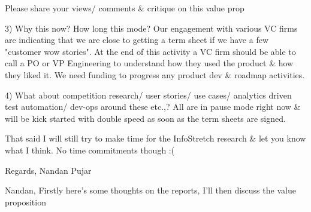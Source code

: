 Please share your views/ comments & critique on this value prop

3) Why this now? How long this mode? 
Our engagement with various VC firms are indicating that we are close to getting a term sheet if we have a few "customer wow stories". At the end of this activity a VC firm should be able to call a PO or VP Engineering to understand how they used the product & how they liked it. We need funding to progress any product dev & roadmap activities.

4) What about competition research/ user stories/ use cases/ analytics driven test automation/ dev-ops around these etc.,?
All are in pause mode right now & will be kick started with double speed as soon as the term sheets are signed.

That said I will still try to make time for the InfoStretch research & let you know what I think. No time commitments though :(

Regards,
Nandan Pujar


Nandan,
Firstly here's some thoughts on the reports, I'll then discuss the value proposition

